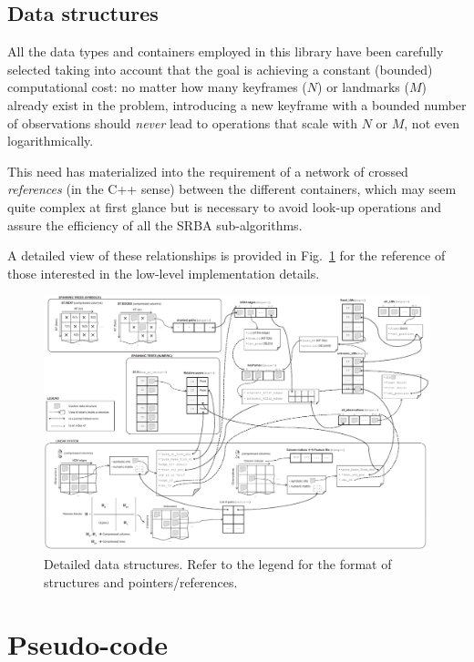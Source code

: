 \documentclass[a4paper,11pt]{article}
\begin{document}
\subsection{Data structures}
\label{sect:data.structs}

All the data types and containers employed in this library 
have been carefully selected taking into account that the goal
is achieving a constant (bounded) computational cost: no matter 
how many keyframes ($N$) or landmarks ($M$) already exist in the problem, 
introducing a new keyframe with a bounded number of observations
should \emph{never} lead to operations that scale with $N$ or $M$, not even logarithmically.

This need has materialized into the requirement of a network of crossed \emph{references} (in the C++ sense)
between the different containers, which may seem quite complex at first glance but 
is necessary to avoid look-up operations and assure the efficiency of all the SRBA sub-algorithms. 

A detailed view of these relationships is provided in Fig.~\ref{fig:detailed.data.structures} 
for the reference of those interested in the low-level implementation details.

\begin{figure}
\centering
\includegraphics[width=1.0\textwidth]{imgs/srba_data_structures.pdf} 
\caption{Detailed data structures. Refer to the legend for the format of structures and pointers/references.}
\label{fig:detailed.data.structures}
\end{figure}



\newpage
\section{Pseudo-code}
\end{document}
